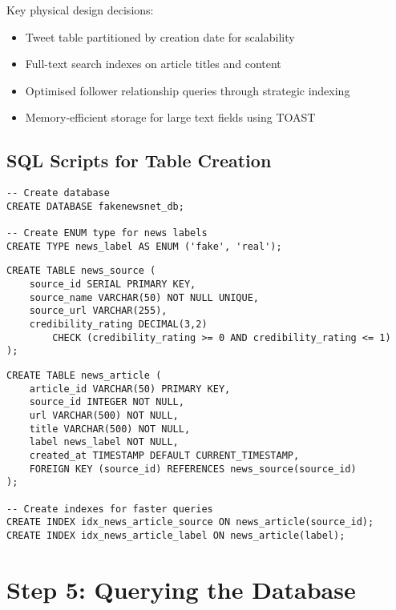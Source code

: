 \documentclass[12pt,a4paper]{report}
\begin{document}
Key physical design decisions:
\begin{itemize}
    \item Tweet table partitioned by creation date for scalability
    \item Full-text search indexes on article titles and content
    \item Optimised follower relationship queries through strategic indexing
    \item Memory-efficient storage for large text fields using TOAST
\end{itemize}

\section{SQL Scripts for Table Creation}

\begin{lstlisting}[caption={Database and Initial Setup}]
-- Create database
CREATE DATABASE fakenewsnet_db;

-- Create ENUM type for news labels
CREATE TYPE news_label AS ENUM ('fake', 'real');
\end{lstlisting}

\begin{lstlisting}[caption={NewsSource Table}]
CREATE TABLE news_source (
    source_id SERIAL PRIMARY KEY,
    source_name VARCHAR(50) NOT NULL UNIQUE,
    source_url VARCHAR(255),
    credibility_rating DECIMAL(3,2) 
        CHECK (credibility_rating >= 0 AND credibility_rating <= 1)
);
\end{lstlisting}

\begin{lstlisting}[caption={NewsArticle Table}]
CREATE TABLE news_article (
    article_id VARCHAR(50) PRIMARY KEY,
    source_id INTEGER NOT NULL,
    url VARCHAR(500) NOT NULL,
    title VARCHAR(500) NOT NULL,
    label news_label NOT NULL,
    created_at TIMESTAMP DEFAULT CURRENT_TIMESTAMP,
    FOREIGN KEY (source_id) REFERENCES news_source(source_id)
);

-- Create indexes for faster queries
CREATE INDEX idx_news_article_source ON news_article(source_id);
CREATE INDEX idx_news_article_label ON news_article(label);
\end{lstlisting}

\chapter{Step 5: Querying the Database}
\end{document}
